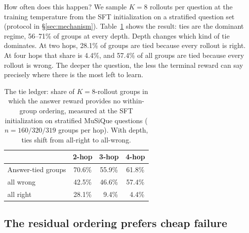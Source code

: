 How often does this happen? We sample $K{=}8$ rollouts per question at
the training temperature from the SFT initialization on a stratified
question set (protocol in \S\ref{sec:mechanism}).
Table~\ref{tab:tie-ledger} shows the result: ties are the dominant
regime, 56--71\% of groups at every depth. Depth changes which kind of
tie dominates. At two hops, 28.1\% of groups are tied because every
rollout is right. At four hops that share is 4.4\%, and 57.4\% of all
groups are tied because every rollout is wrong. The deeper the
question, the less the terminal reward
can say precisely where there is the most left to learn.

\begin{table}[t]
\centering
\small
\begin{tabular}{lccc}
\toprule
 & 2-hop & 3-hop & 4-hop \\
\midrule
Answer-tied groups & 70.6\% & 55.9\% & 61.8\% \\
\quad all wrong    & 42.5\% & 46.6\% & 57.4\% \\
\quad all right    & 28.1\% & ~9.4\% & ~4.4\% \\
\bottomrule
\end{tabular}
\caption{The tie ledger: share of $K{=}8$-rollout groups in which
the answer reward provides no within-group ordering, measured at the
SFT initialization on stratified MuSiQue questions ($n{=}160/320/319$
groups per hop). With depth, ties shift from all-right to all-wrong.}
\label{tab:tie-ledger}
\end{table}

\subsection{The residual ordering prefers cheap failure}
\label{sec:starve-cost}

